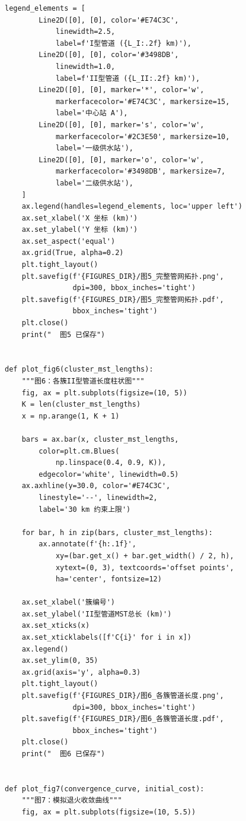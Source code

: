 \documentclass[12pt,a4paper]{ctexart}
\theoremstyle{definition}
\theoremstyle{plain}
\theoremstyle{remark}
\begin{document}
\begin{lstlisting}[caption={\texttt{visualization.py}：论文图表生成}]
    legend_elements = [
        Line2D([0], [0], color='#E74C3C',
            linewidth=2.5,
            label=f'I型管道 ({L_I:.2f} km)'),
        Line2D([0], [0], color='#3498DB',
            linewidth=1.0,
            label=f'II型管道 ({L_II:.2f} km)'),
        Line2D([0], [0], marker='*', color='w',
            markerfacecolor='#E74C3C', markersize=15,
            label='中心站 A'),
        Line2D([0], [0], marker='s', color='w',
            markerfacecolor='#2C3E50', markersize=10,
            label='一级供水站'),
        Line2D([0], [0], marker='o', color='w',
            markerfacecolor='#3498DB', markersize=7,
            label='二级供水站'),
    ]
    ax.legend(handles=legend_elements, loc='upper left')
    ax.set_xlabel('X 坐标 (km)')
    ax.set_ylabel('Y 坐标 (km)')
    ax.set_aspect('equal')
    ax.grid(True, alpha=0.2)
    plt.tight_layout()
    plt.savefig(f'{FIGURES_DIR}/图5_完整管网拓扑.png',
                dpi=300, bbox_inches='tight')
    plt.savefig(f'{FIGURES_DIR}/图5_完整管网拓扑.pdf',
                bbox_inches='tight')
    plt.close()
    print("  图5 已保存")


def plot_fig6(cluster_mst_lengths):
    """图6：各簇II型管道长度柱状图"""
    fig, ax = plt.subplots(figsize=(10, 5))
    K = len(cluster_mst_lengths)
    x = np.arange(1, K + 1)

    bars = ax.bar(x, cluster_mst_lengths,
        color=plt.cm.Blues(
            np.linspace(0.4, 0.9, K)),
        edgecolor='white', linewidth=0.5)
    ax.axhline(y=30.0, color='#E74C3C',
        linestyle='--', linewidth=2,
        label='30 km 约束上限')

    for bar, h in zip(bars, cluster_mst_lengths):
        ax.annotate(f'{h:.1f}',
            xy=(bar.get_x() + bar.get_width() / 2, h),
            xytext=(0, 3), textcoords='offset points',
            ha='center', fontsize=12)

    ax.set_xlabel('簇编号')
    ax.set_ylabel('II型管道MST总长 (km)')
    ax.set_xticks(x)
    ax.set_xticklabels([f'C{i}' for i in x])
    ax.legend()
    ax.set_ylim(0, 35)
    ax.grid(axis='y', alpha=0.3)
    plt.tight_layout()
    plt.savefig(f'{FIGURES_DIR}/图6_各簇管道长度.png',
                dpi=300, bbox_inches='tight')
    plt.savefig(f'{FIGURES_DIR}/图6_各簇管道长度.pdf',
                bbox_inches='tight')
    plt.close()
    print("  图6 已保存")


def plot_fig7(convergence_curve, initial_cost):
    """图7：模拟退火收敛曲线"""
    fig, ax = plt.subplots(figsize=(10, 5.5))


\end{lstlisting}
\end{document}
